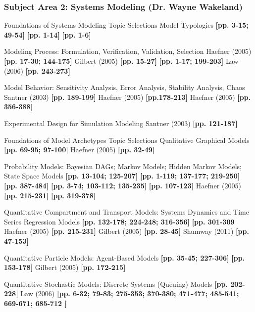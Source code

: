 \documentclass[12pt]{article}
\begin{document}
\subsubsection{Subject Area 2: Systems Modeling (Dr. Wayne Wakeland)}
\begin{outline}[enumerate]
\1 Foundations of Systems Modeling
\2 Topic Selections
\3 Model Typologies
\4 \cite{haefner_modeling_2005} \textbf{[pp. 3-15; 49-54]}
\4 \cite{gilbert_simulation_2005} \textbf{[pp. 1-14]}
\4 \cite{law_simulation_2006} \textbf{[pp. 1-6]}

\3 Modeling Process: Formulation, Verification, Validation, Selection
\4 Haefner (2005) \textbf{[pp. 17-30; 144-175]}
\4 Gilbert (2005) \textbf{[pp. 15-27]}
\4 \cite{santner_design_2003} \textbf{[pp. 1-17; 199-203]}
\4 Law (2006) \textbf{[pp. 243-273]}

\3 Model Behavior: Sensitivity Analysis, Error Analysis, Stability Analysis, Chaos
\4 Santner (2003) \textbf{[pp. 189-199]}
\4 Haefner (2005) \textbf{[pp.178-213]}
\4 Haefner (2005) \textbf{[pp. 356-388]}
\4 \cite{may_thresholds_1977}
\4 \cite{may_simple_1976}

\3 Experimental Design for Simulation Modeling
\4 Santner (2003) \textbf{[pp. 121-187]}

\1 Foundations of Model Archetypes
\2 Topic Selections
\3 Qualitative Graphical Models
\4 \cite{ford_modeling_1999} \textbf{[pp. 69-95; 97-100]}
\4 Haefner (2005) \textbf{[pp. 32-49]}

\3 Probability Models: Bayesian DAGs; Markov Models; Hidden Markov Models; State Space Models
\4 \cite{hoff_first_2009} \textbf{[pp. 13-104; 125-207]}
\4 \cite{lunn_bugs_2013}  \textbf{[pp. 1-119; 137-177; 219-250]}
\4 \cite{alpaydin_introduction_2014} \textbf{[pp. 387-484]}
\4 \cite{zucchini_hidden_2009} \textbf{[pp. 3-74; 103-112; 135-235]}
\4 \cite{fink_markov_2014} \textbf{[pp. 107-123]}
\4 Haefner (2005) \textbf{[pp. 215-231]}
\4 \cite{shumway_time_2011} \textbf{[pp. 319-378]}

\3 Quantitative Compartment and Transport Models: Systems Dynamics and Time Series Regression Models
\4 \cite{luenberger_introduction_1979} \textbf{[pp. 132-178; 224-248; 316-356]}
\4 \cite{lay_linear_2012} \textbf{[pp. 301-309}
\4 Haefner (2005) \textbf{[pp. 215-231]}
\4 Gilbert (2005) \textbf{[pp. 28-45]}
\4 Shumway (2011) \textbf{[pp. 47-153]}

\3 Quantitative Particle Models: Agent-Based Models
\4 \cite{railsback_agent-based_2012} \textbf{[pp. 35-45; 227-306]}
\4 \cite{gilbert_agent-based_2008}
\4 \cite{resnick_turtles_1994}
\4 \cite{epstein_growing_1996} \textbf{[pp. 153-178]}
\4 Gilbert (2005) \textbf{[pp. 172-215]}

\3 Quantitative Stochastic Models: Discrete Systems (Queuing) Models
\4 \cite{kelton_simulation_2010} \textbf{[pp. 202-228]}
\4 Law (2006) \textbf{[pp. 6-32; 79-83; 275-353; 370-380; 471-477; 485-541; 669-671; 685-712 ]}
\end{outline}
\end{document}
